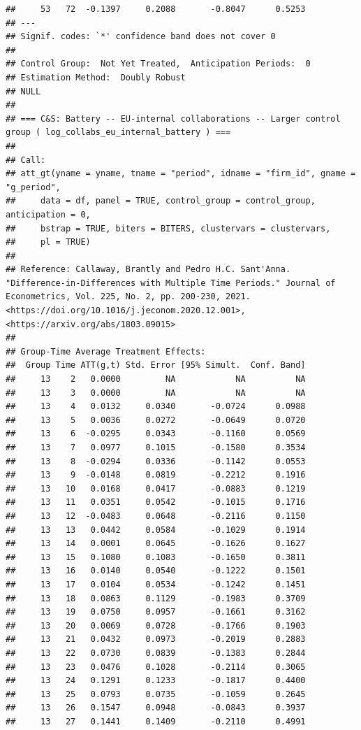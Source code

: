 \documentclass[
]{article}
\begin{document}
\begin{verbatim}
##     53   72  -0.1397     0.2088       -0.8047      0.5253  
## ---
## Signif. codes: `*' confidence band does not cover 0
## 
## Control Group:  Not Yet Treated,  Anticipation Periods:  0
## Estimation Method:  Doubly Robust
## NULL
## 
## === C&S: Battery -- EU-internal collaborations -- Larger control group ( log_collabs_eu_internal_battery ) ===
## 
## Call:
## att_gt(yname = yname, tname = "period", idname = "firm_id", gname = "g_period", 
##     data = df, panel = TRUE, control_group = control_group, anticipation = 0, 
##     bstrap = TRUE, biters = BITERS, clustervars = clustervars, 
##     pl = TRUE)
## 
## Reference: Callaway, Brantly and Pedro H.C. Sant'Anna.  "Difference-in-Differences with Multiple Time Periods." Journal of Econometrics, Vol. 225, No. 2, pp. 200-230, 2021. <https://doi.org/10.1016/j.jeconom.2020.12.001>, <https://arxiv.org/abs/1803.09015> 
## 
## Group-Time Average Treatment Effects:
##  Group Time ATT(g,t) Std. Error [95% Simult.  Conf. Band] 
##     13    2   0.0000         NA            NA          NA 
##     13    3   0.0000         NA            NA          NA 
##     13    4   0.0132     0.0340       -0.0724      0.0988 
##     13    5   0.0036     0.0272       -0.0649      0.0720 
##     13    6  -0.0295     0.0343       -0.1160      0.0569 
##     13    7   0.0977     0.1015       -0.1580      0.3534 
##     13    8  -0.0294     0.0336       -0.1142      0.0553 
##     13    9  -0.0148     0.0819       -0.2212      0.1916 
##     13   10   0.0168     0.0417       -0.0883      0.1219 
##     13   11   0.0351     0.0542       -0.1015      0.1716 
##     13   12  -0.0483     0.0648       -0.2116      0.1150 
##     13   13   0.0442     0.0584       -0.1029      0.1914 
##     13   14   0.0001     0.0645       -0.1626      0.1627 
##     13   15   0.1080     0.1083       -0.1650      0.3811 
##     13   16   0.0140     0.0540       -0.1222      0.1501 
##     13   17   0.0104     0.0534       -0.1242      0.1451 
##     13   18   0.0863     0.1129       -0.1983      0.3709 
##     13   19   0.0750     0.0957       -0.1661      0.3162 
##     13   20   0.0069     0.0728       -0.1766      0.1903 
##     13   21   0.0432     0.0973       -0.2019      0.2883 
##     13   22   0.0730     0.0839       -0.1383      0.2844 
##     13   23   0.0476     0.1028       -0.2114      0.3065 
##     13   24   0.1291     0.1233       -0.1817      0.4400 
##     13   25   0.0793     0.0735       -0.1059      0.2645 
##     13   26   0.1547     0.0948       -0.0843      0.3937 
##     13   27   0.1441     0.1409       -0.2110      0.4991 

\end{verbatim}
\end{document}

